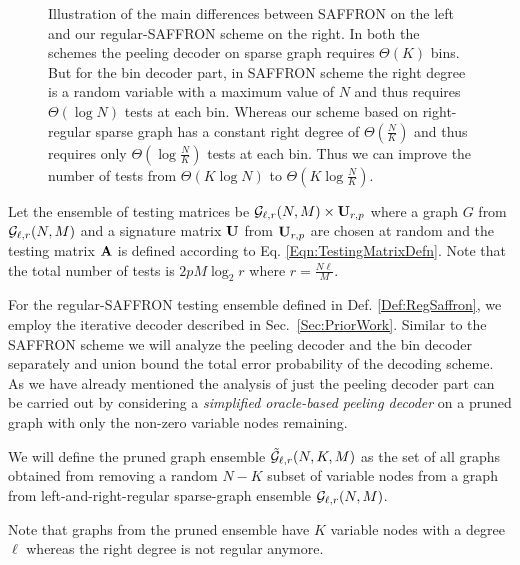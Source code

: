 \begin{figure*}[t!]
\centering \scalebox{1}{}
\caption{Illustration of the main differences between SAFFRON \cite{lee2015saffron} on the left and our regular-SAFFRON scheme on the right. In both the schemes the peeling decoder on sparse graph requires $\Theta(K)$ bins. But for the bin decoder part, in SAFFRON scheme the right degree is a random variable with a maximum value of $N$ and thus requires $\Theta(\log N)$ tests at each bin. Whereas our scheme based on right-regular sparse graph has a constant right degree of $\Theta(\frac{N}{K})$ and thus requires only $\Theta(\log \frac{N}{K})$ tests at each bin. Thus we can improve the number of tests from $\Theta (K\log N)$ to $\Theta(K\log \frac{N}{K})$.}
\end{figure*}

\begin{definition}
\label{Def:RegSaffron}
Let the ensemble of testing matrices be $\mathcal{G}_{\ell,r}(N,M)\times \mathbf{U}_{r,p}$ where a graph $G$ from $\mathcal{G}_{\ell,r}(N,M)$ and a signature matrix $\mathbf{U}$ from $\mathbf{U}_{r,p}$ are chosen at random and the testing matrix $\mathbf{A}$ is defined according to Eq. \eqref{Eqn:TestingMatrixDefn}. Note that the total number of tests is $2pM\log_2 r$ where $r=\frac{N\ell}{M}$.
\end{definition}

For the regular-SAFFRON testing ensemble defined in Def. \ref{Def:RegSaffron}, we employ the iterative decoder described in Sec.~\ref{Sec:PriorWork}. Similar to the SAFFRON scheme we will analyze the peeling decoder and the bin decoder separately and union bound the total error probability of the decoding scheme. As we have already mentioned the analysis of just the peeling decoder part can be carried out by considering a \textit{simplified oracle-based peeling decoder} on a pruned graph with only the non-zero variable nodes remaining. 

\begin{definition}
We will define the pruned graph ensemble $\tilde{\mathcal{G}}_{\ell,r}(N,K,M)$ as the set of all graphs obtained from removing a random $N-K$ subset of variable nodes from a graph from left-and-right-regular sparse-graph ensemble $\mathcal{G}_{\ell,r}(N,M)$.
\end{definition}

Note that graphs from the pruned ensemble have $K$ variable nodes with a degree $\ell$ whereas the right degree is not regular anymore. 

